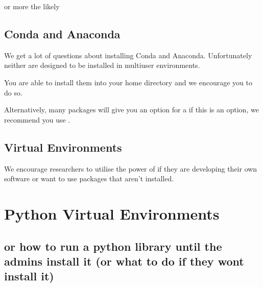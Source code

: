\documentclass[letterpaper,10pt,english]{sphinxmanual}
\begin{document}
\begin{sphinxVerbatim}[commandchars=\\\{\}]
\end{sphinxVerbatim}

or more the likely

\begin{sphinxVerbatim}[commandchars=\\\{\}]
\end{sphinxVerbatim}


\subsection{Conda and Anaconda}
\label{\detokenize{software/python:conda-and-anaconda}}
We get a lot of questions about installing Conda and Anaconda. Unfortunately neither are designed to be installed in multi\sphinxhyphen{}user environments.

You are able to install them into your home directory and we encourage you to do so.

Alternatively, many packages will give you an option for a  \sphinxhyphen{} if this is an option, we recommend you use .


\subsection{Virtual Environments}
\label{\detokenize{software/python:virtual-environments}}
We encourage researchers to utilise the power of {\hyperref[\detokenize{software/python-virtualenvs:python-virtual-environments}]{}} if they are developing their own software or want to use packages that aren’t installed.


\section{Python Virtual Environments}
\label{\detokenize{software/python-virtualenvs:python-virtual-environments}}\label{\detokenize{software/python-virtualenvs::doc}}

\subsection{or how to run a python library until the admins install it (or what to do if they wont install it)}
\label{\detokenize{software/python-virtualenvs:or-how-to-run-a-python-library-until-the-admins-install-it-or-what-to-do-if-they-wont-install-it}}
\end{document}
